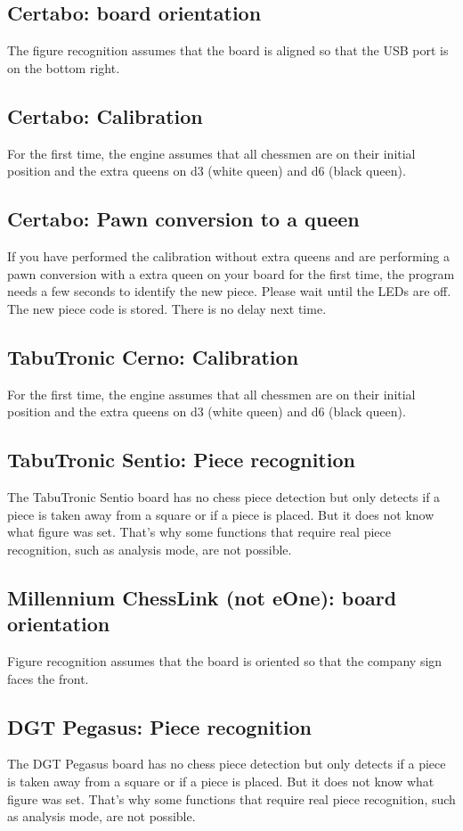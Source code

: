 \documentclass[11pt,a4paper]{article}
\begin{document}
\subsection{Certabo: board orientation}
The figure recognition assumes that the board is aligned so that the USB port is on the bottom right.

\subsection{Certabo: Calibration}
For the first time, the engine assumes that all chessmen are on their initial position and the extra queens on d3 (white queen) and d6 (black queen).

\subsection{Certabo: Pawn conversion to a queen}
If you have performed the calibration without extra queens and are performing a pawn conversion with a extra queen on your board for the first time, the program needs a few seconds to identify the new piece. Please wait until the LEDs are off. The new piece code is stored. There is no delay next time.

\subsection{TabuTronic Cerno: Calibration}
For the first time, the engine assumes that all chessmen are on their initial position and the extra queens on d3 (white queen) and d6 (black queen).

\subsection{TabuTronic Sentio: Piece recognition}
The TabuTronic Sentio board has no chess piece detection but only detects if a piece is taken away from a square or if a piece is placed. But it does not know what figure was set. That's why some functions that require real piece recognition, such as analysis mode, are not possible.

\subsection{Millennium ChessLink (not eOne): board orientation}
Figure recognition assumes that the board is oriented so that the company sign faces the front.

\subsection{DGT Pegasus: Piece recognition}
The DGT Pegasus board has no chess piece detection but only detects if a piece is taken away from a square or if a piece is placed. But it does not know what figure was set. That's why some functions that require real piece recognition, such as analysis mode, are not possible.
\end{document}

